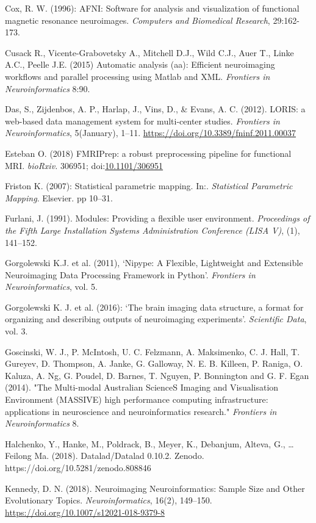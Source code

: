 Cox, R. W. (1996): AFNI: Software for analysis and visualization of
functional magnetic resonance neuroimages. \emph{Computers and
Biomedical Research}, 29:162-173.

Cusack R., Vicente-Grabovetsky A., Mitchell D.J., Wild C.J., Auer T.,
Linke A.C., Peelle J.E. (2015) Automatic analysis (aa): Efficient
neuroimaging workflows and parallel processing using Matlab and XML.
\emph{Frontiers in Neuroinformatics} 8:90.

Das, S., Zijdenbos, A. P., Harlap, J., Vins, D., \& Evans, A. C. (2012).
LORIS: a web-based data management system for multi-center studies.
\emph{Frontiers in Neuroinformatics}, 5(January), 1--11.
\href{https://doi.org/10.3389/fninf.2011.00037}{{https://doi.org/10.3389/fninf.2011.00037}}

Esteban O. (2018) FMRIPrep: a robust preprocessing pipeline for
functional MRI. \emph{bioRxiv.} 306951;
doi:\href{https://doi.org/10.1101/306951}{{10.1101/306951}}

Friston K. (2007): Statistical parametric mapping. In:.
\emph{Statistical Parametric Mapping}. Elsevier. pp 10--31.

Furlani, J. (1991). Modules: Providing a flexible user environment.
\emph{Proceedings of the Fifth Large Installation Systems Administration
Conference (LISA V)}, (1), 141--152.

Gorgolewski K.J. et al. (2011), `Nipype: A Flexible, Lightweight and
Extensible Neuroimaging Data Processing Framework in Python'.
\emph{Frontiers in Neuroinformatics}, vol. 5.

Gorgolewski K. J. et al. (2016): `The brain imaging data structure, a
format for organizing and describing outputs of neuroimaging
experiments'. \emph{Scientific Data}, vol. 3.

Goscinski, W. J., P. McIntosh, U. C. Felzmann, A. Maksimenko, C. J.
Hall, T. Gureyev, D. Thompson, A. Janke, G. Galloway, N. E. B. Killeen,
P. Raniga, O. Kaluza, A. Ng, G. Poudel, D. Barnes, T. Nguyen, P.
Bonnington and G. F. Egan (2014). "The Multi-modal Australian ScienceS
Imaging and Visualisation Environment (MASSIVE) high performance
computing infrastructure: applications in neuroscience and
neuroinformatics research." \emph{Frontiers in Neuroinformatics} 8.

Halchenko, Y., Hanke, M., Poldrack, B., Meyer, K., Debanjum, Alteva, G.,
\ldots{} Feilong Ma. (2018). Datalad/Datalad 0.10.2. Zenodo.
https://doi.org/10.5281/zenodo.808846

Kennedy, D. N. (2018). Neuroimaging Neuroinformatics: Sample Size and
Other Evolutionary Topics. \emph{Neuroinformatics}, 16(2), 149--150.
\href{https://doi.org/10.1007/s12021-018-9379-8}{{https://doi.org/10.1007/s12021-018-9379-8}}

